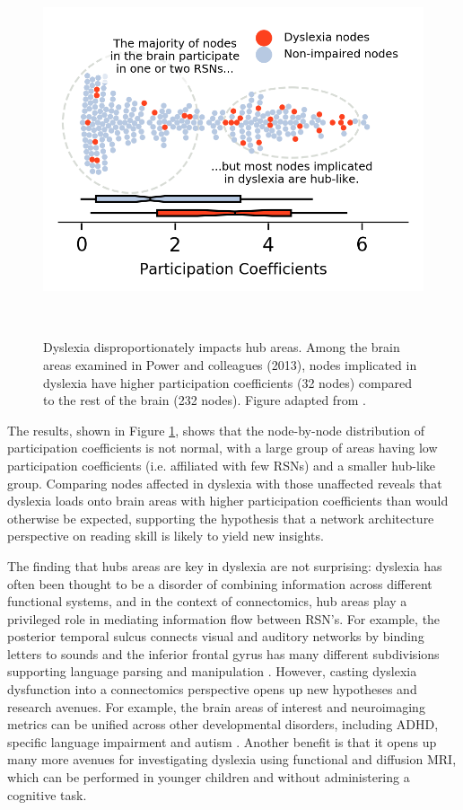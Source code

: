 \begin{figure}[t]
\centering
\includegraphics[height=4.3in]{images/ch1-dyslexia-hubs.png}
    \caption[Dyslexia disproportionately impacts hub areas]{Dyslexia disproportionately impacts hub areas. Among the brain areas examined in Power and colleagues (2013), nodes implicated in dyslexia have higher participation coefficients (32 nodes) compared to the rest of the brain (232 nodes). Figure adapted from \cite{Bailey2018}.}
\label{fig:ch1-dyslexia-hubs}
\end{figure}

The results, shown in Figure \ref{fig:ch1-dyslexia-hubs}, shows that the node-by-node distribution of participation coefficients is not normal, with a large group of areas having low participation coefficients (i.e. affiliated with few RSNs) and a smaller hub-like group. Comparing nodes affected in dyslexia with those unaffected reveals that dyslexia loads onto brain areas with higher participation coefficients than would otherwise be expected, supporting the hypothesis that a network architecture perspective on reading skill is likely to yield new insights. 

The finding that hubs areas are key in dyslexia are not surprising: dyslexia has often been thought to be a disorder of combining information across different functional systems, and in the context of connectomics, hub areas play a privileged role in mediating information flow between RSN’s. For example, the posterior temporal sulcus connects visual and auditory networks by binding letters to sounds \citep{Blau2010, VanAtteveldt2009} and the inferior frontal gyrus has many different subdivisions supporting language parsing and manipulation \citep{Hagoort2005}. However, casting dyslexia dysfunction into a connectomics perspective opens up new hypotheses and research avenues. For example, the brain areas of interest and neuroimaging metrics can be unified across other developmental disorders, including ADHD, specific language impairment and autism \citep{Stam2014}. Another benefit is that it opens up many more avenues for investigating dyslexia using functional and diffusion MRI, which can be performed in younger children and without administering a cognitive task. 


